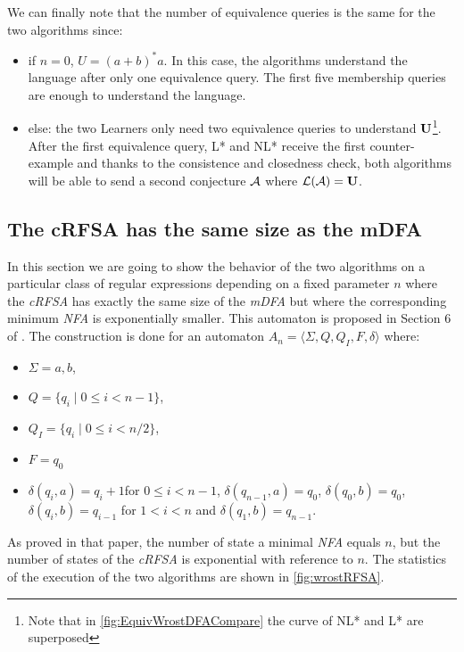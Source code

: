 We can finally note that the number of equivalence queries is the same for the two algorithms since:
\begin{itemize}
  \item if $n = 0$, $U = (a+b)^*a$. In this case, the algorithms understand the language after only one equivalence query. The first five membership queries are enough to understand the language.

  \item else: the two Learners only need two equivalence queries to understand $\mathbf{U}$\footnote{Note that in \cref{fig:EquivWrostDFACompare} the curve of NL* and L* are superposed}. After the first equivalence query, L* and NL* receive the first counter-example and thanks to the consistence and closedness check, both algorithms will be able to send a second conjecture $\mathcal{A}$ where $\mathcal{L}(\mathcal{A}) = \mathbf{U}$.
\end{itemize}

\subsection{The cRFSA has the same size as the mDFA}
\label{sec:worstRFSA}

In this section we are going to show the behavior of the two algorithms on a particular class of regular expressions depending on a fixed parameter $n$ where the \textit{cRFSA} has exactly the same size of the \textit{mDFA} but where the corresponding minimum \textit{NFA} is exponentially smaller.
This automaton is proposed in Section 6 of \cite{RFSA}. The construction is done for an automaton $A_n = \langle \Sigma, Q, Q_I, F, \delta \rangle $ where:
\begin{itemize}
  \item $\Sigma = {a, b}$,
  \item $Q = \{q_i \mid 0 \leq i < n-1 \}$,
  \item $Q_I = \{q_i \mid 0 \leq i < n/2\}$,
  \item $F = q_0$
  \item $\delta(q_i,a) = q_i+1$for $0 \leq i< n - 1$, $\delta(q_{n-1},a) = q_0$, $\delta(q_0,b)=q_0$, $\delta(q_i,b) = q_{i-1}$ for $1<i<n$ and $\delta(q_1,b)=q_{n-1}$.
\end{itemize}

As proved in that paper, the number of state a minimal \textit{NFA} equals $n$, but the number of states of the \textit{cRFSA} is exponential with reference to $n$.
The statistics of the execution of the two algorithms are shown in \cref{fig:wrostRFSA}.

